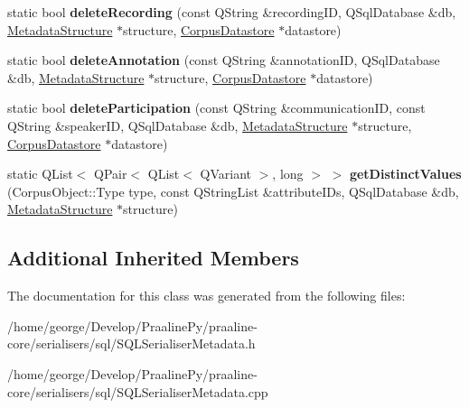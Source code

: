 \begin{DoxyCompactItemize}
\item 
\mbox{\label{class_s_q_l_serialiser_metadata_acaabf1b81c23009d0821d01b222a014f}} 
static bool {\bfseries delete\+Recording} (const Q\+String \&recording\+ID, Q\+Sql\+Database \&db, \hyperlink{class_metadata_structure}{Metadata\+Structure} $\ast$structure, \hyperlink{class_corpus_datastore}{Corpus\+Datastore} $\ast$datastore)
\item 
\mbox{\label{class_s_q_l_serialiser_metadata_a0c82f04a58aba205b2fd687b267711a4}} 
static bool {\bfseries delete\+Annotation} (const Q\+String \&annotation\+ID, Q\+Sql\+Database \&db, \hyperlink{class_metadata_structure}{Metadata\+Structure} $\ast$structure, \hyperlink{class_corpus_datastore}{Corpus\+Datastore} $\ast$datastore)
\item 
\mbox{\label{class_s_q_l_serialiser_metadata_a3ba470a537680373b8330e6262492d92}} 
static bool {\bfseries delete\+Participation} (const Q\+String \&communication\+ID, const Q\+String \&speaker\+ID, Q\+Sql\+Database \&db, \hyperlink{class_metadata_structure}{Metadata\+Structure} $\ast$structure, \hyperlink{class_corpus_datastore}{Corpus\+Datastore} $\ast$datastore)
\item 
\mbox{\label{class_s_q_l_serialiser_metadata_a80ca02357239be6f8ee21f0f9ca86861}} 
static Q\+List$<$ Q\+Pair$<$ Q\+List$<$ Q\+Variant $>$, long $>$ $>$ {\bfseries get\+Distinct\+Values} (Corpus\+Object\+::\+Type type, const Q\+String\+List \&attribute\+I\+Ds, Q\+Sql\+Database \&db, \hyperlink{class_metadata_structure}{Metadata\+Structure} $\ast$structure)
\end{DoxyCompactItemize}
\subsection*{Additional Inherited Members}


The documentation for this class was generated from the following files\+:\begin{DoxyCompactItemize}
\item 
/home/george/\+Develop/\+Praaline\+Py/praaline-\/core/serialisers/sql/S\+Q\+L\+Serialiser\+Metadata.\+h\item 
/home/george/\+Develop/\+Praaline\+Py/praaline-\/core/serialisers/sql/S\+Q\+L\+Serialiser\+Metadata.\+cpp\end{DoxyCompactItemize}
